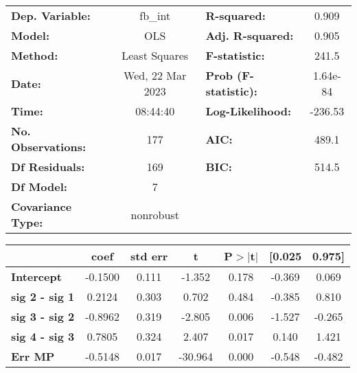 \begin{center}
\begin{tabular}{lclc}
\toprule
\textbf{Dep. Variable:}    &     fb\_int      & \textbf{  R-squared:         } &    0.909  \\
\textbf{Model:}            &       OLS        & \textbf{  Adj. R-squared:    } &    0.905  \\
\textbf{Method:}           &  Least Squares   & \textbf{  F-statistic:       } &    241.5  \\
\textbf{Date:}             & Wed, 22 Mar 2023 & \textbf{  Prob (F-statistic):} & 1.64e-84  \\
\textbf{Time:}             &     08:44:40     & \textbf{  Log-Likelihood:    } &  -236.53  \\
\textbf{No. Observations:} &         177      & \textbf{  AIC:               } &    489.1  \\
\textbf{Df Residuals:}     &         169      & \textbf{  BIC:               } &    514.5  \\
\textbf{Df Model:}         &           7      & \textbf{                     } &           \\
\textbf{Covariance Type:}  &    nonrobust     & \textbf{                     } &           \\
\bottomrule
\end{tabular}
\end{center}\begin{center}
\begin{tabular}{lcccccc}
\toprule
                                & \textbf{coef} & \textbf{std err} & \textbf{t} & \textbf{P$> |$t$|$} & \textbf{[0.025} & \textbf{0.975]}  \\
\midrule
\textbf{Intercept}              &      -0.1500  &        0.111     &    -1.352  &         0.178        &       -0.369    &        0.069     \\
\textbf{sig 2 - sig 1}          &       0.2124  &        0.303     &     0.702  &         0.484        &       -0.385    &        0.810     \\
\textbf{sig 3 - sig 2}          &      -0.8962  &        0.319     &    -2.805  &         0.006        &       -1.527    &       -0.265     \\
\textbf{sig 4 - sig 3}          &       0.7805  &        0.324     &     2.407  &         0.017        &        0.140    &        1.421     \\
\textbf{Err MP}                 &      -0.5148  &        0.017     &   -30.964  &         0.000        &       -0.548    &       -0.482     \\

\end{tabular}
\end{center}
